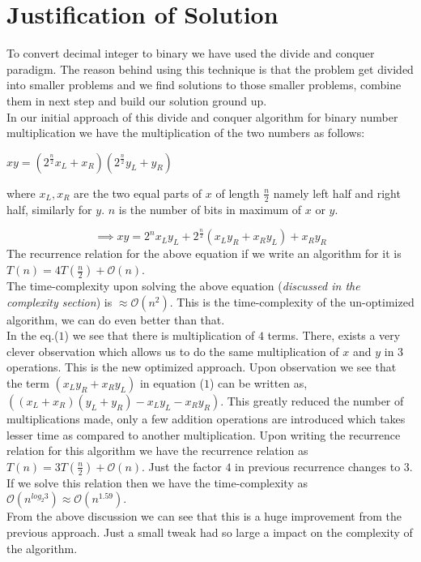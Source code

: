 \documentclass[12pt,a4paper]{article}%
\begin{document}
	\section{Justification of Solution}
	\begin{flushleft}
	To convert decimal integer to binary we have used the divide and conquer paradigm. The reason behind using this technique is that the problem get divided into smaller problems and we find solutions to those smaller problems, combine them in next step and build our solution ground up.\\\smallskip
	In our initial approach of this divide and conquer algorithm for binary number multiplication we have the multiplication of the two numbers as follows:\\\smallskip
	\begin{center}
		$xy=(2^{\frac{n}{2}} x_L + x_R)(2^{\frac{n}{2}} y_L+y_R)$\\
	\end{center}
	where $x_L,x_R$ are the two equal parts of $x$ of length $\frac{n}{2}$ namely left half and right half, similarly for $y$. $n$ is the number of bits in maximum of $x$ or $y$.

	\begin{equation}
		\implies xy = 2^{n} x_L y_L + 2^{\frac{n}{2}} ( x_L y_R + x_R y_L ) + x_R y_R 
	\end{equation}
	The recurrence relation for the above equation if we write an algorithm for it is $T(n)=4T(\frac{n}{2})+\mathcal{O}(n)$.
	\\\smallskip
	The time-complexity upon solving the above equation (\textit{discussed in the complexity section}) is $\approx \mathcal{O}(n^{2})$. This is the time-complexity of the un-optimized algorithm, we can do even better than that.\\\smallskip 
	In the eq.($1$) we see that there is multiplication of $4$ terms. There, exists a very clever observation which allows us to do the same multiplication of $x$ and $y$ in $3$ operations. This is the new optimized approach. Upon observation we see that the term $( x_L y_R + x_R y_L )$ in equation ($1$) can be written as,
	$((x_L +x_R)(y_L +y_R) - x_L y_L - x_R y_R )$. This greatly reduced the number of multiplications made, only a few addition operations are introduced which takes lesser time as compared to another multiplication. Upon writing the recurrence relation for this algorithm we have the recurrence relation as $T(n)=3T(\frac{n}{2})+\mathcal{O}(n)$. Just the factor $4$ in previous recurrence changes to $3$. If we solve this relation then we have the time-complexity as $\mathcal{O}(n^{log_2 {3}}) \approx \mathcal{O}(n^{1.59})$.\\\smallskip
	From the above discussion we can see that this is a huge improvement from the previous approach. Just a small tweak had so large a impact on the complexity of the algorithm.
	\end{flushleft}
	\break
\end{document}
